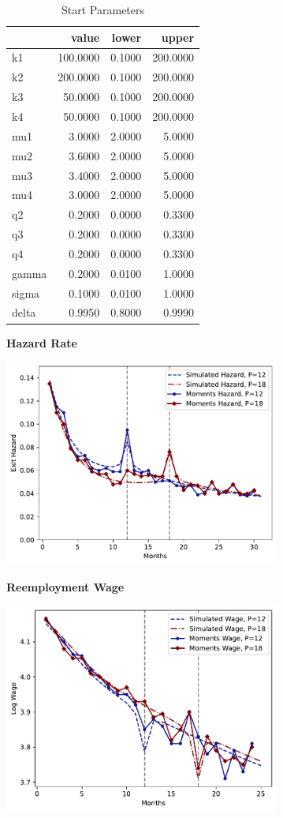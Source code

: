 \documentclass[letter, 10pt]{article}
\begin{document}
\begin{table}[h]
\centering
\caption{Start Parameters}
\begin{tabular}{lrrr}
\toprule
 & value & lower & upper \\
\midrule
k1 & 100.0000 & 0.1000 & 200.0000 \\
k2 & 200.0000 & 0.1000 & 200.0000 \\
k3 & 50.0000 & 0.1000 & 200.0000 \\
k4 & 50.0000 & 0.1000 & 200.0000 \\
mu1 & 3.0000 & 2.0000 & 5.0000 \\
mu2 & 3.6000 & 2.0000 & 5.0000 \\
mu3 & 3.4000 & 2.0000 & 5.0000 \\
mu4 & 3.0000 & 2.0000 & 5.0000 \\
q2 & 0.2000 & 0.0000 & 0.3300 \\
q3 & 0.2000 & 0.0000 & 0.3300 \\
q4 & 0.2000 & 0.0000 & 0.3300 \\
gamma & 0.2000 & 0.0100 & 1.0000 \\
sigma & 0.1000 & 0.0100 & 1.0000 \\
delta & 0.9950 & 0.8000 & 0.9990 \\
\bottomrule
\end{tabular}
\end{table}

\textbf{Hazard Rate} 
 

\includegraphics[clip=true,trim=0cm 0cm 0cm 0cm,width = 0.68\textwidth]{figures_Est1_compiled/fig_haz.pdf} 

\textbf{Reemployment Wage} 
 

\includegraphics[clip=true,trim=0cm 0cm 0cm 0cm,width = 0.68\textwidth]{figures_Est1_compiled/fig_wage.pdf} 
\end{document}
